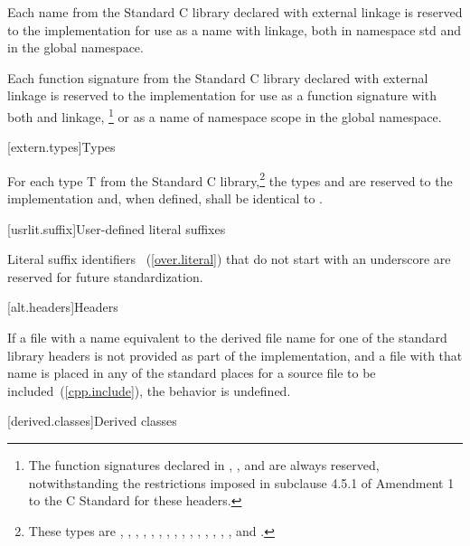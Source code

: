 \pnum
Each name from the Standard C library declared with external linkage
%
is reserved to the implementation for use as a name with
%
%
linkage,
both in namespace std and in the global namespace.

\pnum
Each function signature from the Standard C library declared with
%
external linkage
is reserved to the implementation for use as
a function signature with both
%
and
%
linkage,
\footnote{
The function
signatures declared in
%
%
%
%
%
%
, 
,
and
are always reserved, notwithstanding the restrictions imposed in subclause
4.5.1 of Amendment 1 to the C Standard for these headers.}
or as a name of namespace scope in the global namespace.

[extern.types]{Types}

\pnum
For each type T from the Standard C library,\footnote{These types are
,
,
,
,
,
,
,
,
,
,
,
,
,
,
,
and
.}
the types
and
are reserved to the implementation and, when defined,
shall be identical to
.

[usrlit.suffix]{User-defined literal suffixes}

\pnum
Literal suffix identifiers ~(\ref{over.literal}) that do not start with an underscore are reserved for future standardization.

[alt.headers]{Headers}

\pnum
If a file with a name
%
equivalent to the derived file name for one of the \Cpp standard library headers
is not provided as part of the implementation, and a file with that name
is placed in any of the standard places for a source file to be included~(\ref{cpp.include}),
the behavior is undefined.%
%

[derived.classes]{Derived classes}

